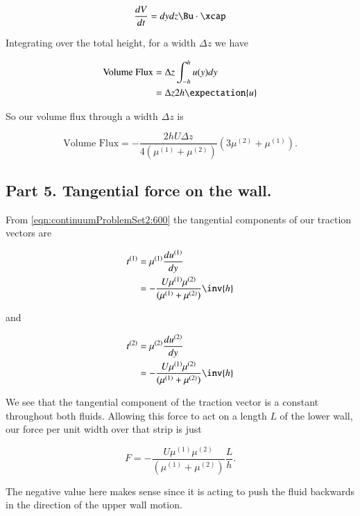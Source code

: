 \begin{equation}\label{eqn:continuumProblemSet2:700}
\frac{dV}{dt} = dy dz \Bu \cdot \xcap
\end{equation}

Integrating over the total height, for a width $\Delta z$ we have

\begin{align*}
\text{Volume Flux} 
&= \Delta z \int_{-h}^h u(y) dy \\
&= \Delta z 2h \expectation{u} \\
\end{align*}

So our volume flux through a width $\Delta z$ is

\begin{equation}\label{eqn:continuumProblemSet2:720}
\text{Volume Flux} 
=
-\frac{2 h U \Delta z}{ 4 (\mu^{(1)} + \mu^{(2)})} \left( 3 \mu^{(2)} + \mu^{(1)} \right).
\end{equation}

\subsection{Part 5.  Tangential force on the wall.}

From \ref{eqn:continuumProblemSet2:600} the tangential components of our traction vectors are

\begin{align*}
t^{(1)} 
&= \mu^{(1)} \frac{d u^{(1)}}{dy} \\
&= -\frac{U \mu^{(1)} \mu^{(2)} }{(\mu^{(1)} + \mu^{(2)})} \inv{h}
\end{align*}

and

\begin{align*}
t^{(2)} 
&= \mu^{(2)} \frac{d u^{(2)}}{dy} \\
&= -\frac{U \mu^{(1)} \mu^{(2)} }{(\mu^{(1)} + \mu^{(2)})} \inv{h}
\end{align*}

We see that the tangential component of the traction vector is a constant throughout both fluids.  Allowing this force to act on a length $L$ of the lower wall, our force per unit width over that strip is just

\begin{equation}\label{eqn:continuumProblemSet2:740}
F = -\frac{U \mu^{(1)} \mu^{(2)} }{(\mu^{(1)} + \mu^{(2)})} \frac{L}{h}.
\end{equation}

The negative value here makes sense since it is acting to push the fluid backwards in the direction of the upper wall motion.

